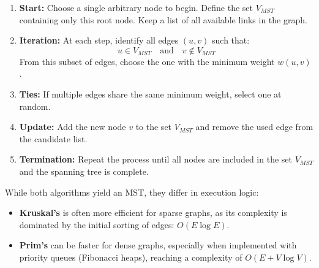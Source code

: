 \begin{enumerate}
    \item \textbf{Start:} Choose a single arbitrary node to begin. Define the set \( V_{MST} \) containing only this root node. Keep a list of all available links in the graph.
    \item \textbf{Iteration:} At each step, identify all edges \( (u, v) \) such that:
          \[
              u \in V_{MST} \quad \text{and} \quad v \notin V_{MST}
          \]
          From this subset of edges, choose the one with the minimum weight \( w(u, v) \).
    \item \textbf{Ties:} If multiple edges share the same minimum weight, select one at random.
    \item \textbf{Update:} Add the new node \( v \) to the set \( V_{MST} \) and remove the used edge from the candidate list.
    \item \textbf{Termination:} Repeat the process until all nodes are included in the set \( V_{MST} \) and the spanning tree is complete.
\end{enumerate}

\begin{remark}
    While both algorithms yield an MST, they differ in execution logic:
    \begin{itemize}
        \item \textbf{Kruskal's} is often more efficient for sparse graphs, as its complexity is dominated by the initial sorting of edges: \( O(E \log E) \).
        \item \textbf{Prim's} can be faster for dense graphs, especially when implemented with priority queues (Fibonacci heaps), reaching a complexity of \( O(E + V \log V) \).
    \end{itemize}
\end{remark}

